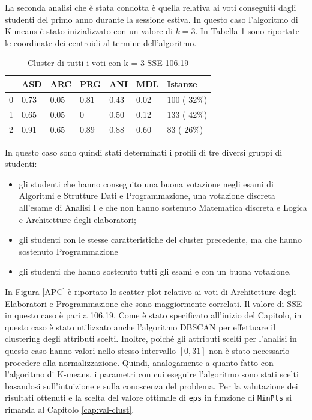 \documentclass[12pt]{article}
\begin{document}
La seconda analisi che è stata condotta è quella relativa ai voti conse\-guiti dagli studenti del primo anno durante la sessione estiva. In questo caso l'algoritmo di K-means è stato inizializzato con un valore di $k=3$.
In Tabella \ref{c3V} sono riportate le coordinate dei centroidi al termine dell'algori\-tmo. 
\begin{table}[ht]
	\centering
	\begin{tabular}{@{}lllllll@{}}
	\toprule
	  & ASD  & ARC  & PRG & ANI  & MDL  & Istanze      \\ \midrule
	0 & 0.73 & 0.05 & 0.81& 0.43 & 0.02 &  100  ( 32\%)\\
	1 & 0.65 & 0.05 & 0   & 0.50 & 0.12 &  133 ( 42\%) \\
	2 & 0.91 & 0.65 & 0.89& 0.88 & 0.60 &  83  ( 26\%) \\ \bottomrule
	\end{tabular}
	\caption{Cluster di tutti i voti con k = 3 SSE 106.19}
	\label{c3V}
\end{table}
In questo caso sono quindi stati determinati i profili di tre diversi gruppi di studenti:
\begin{itemize}
\item gli studenti che hanno conseguito una buona votazione negli esami di Algoritmi e Strutture Dati e Programmazione,
una votazione dis\-creta all'esame di Analisi I e che non hanno sostenuto Matematica discreta e Logica e Architetture degli elaboratori;
\item gli studenti con le stesse caratteristiche del cluster precedente, ma che hanno sostenuto Programmazione
\item gli studenti che hanno sostenuto tutti gli esami e con un buona vota\-zione.
\end{itemize}
In Figura \ref{APC} è riportato lo scatter plot relativo ai voti di Architetture degli Elaboratori e Programmazione che sono
maggiormente correlati. Il valore di SSE in questo caso è pari a 106.19. 
Come è stato specificato all'inizio del Capitolo, in questo caso è stato utilizzato anche l'algoritmo DBSCAN per effettuare il clustering degli attributi scelti. 
Inoltre, poiché gli attributi scelti per l'analisi in questo caso hanno valori nello stesso intervallo $[0,31]$ non è stato necessario procedere alla normalizzazione. 
Quindi, analoga\-mente a quanto fatto con l'algoritmo di K-means, i parametri con cui ese\-guire l'algoritmo sono stati scelti basandosi sull'intuizione e sulla cono\-scenza del problema. 
Per la valutazione dei risultati ottenuti e la scelta del valore ottimale di \texttt{eps} in funzione di \texttt{MinPts} si rimanda al Capitolo \ref{cap:val-clust}. 
\end{document}
